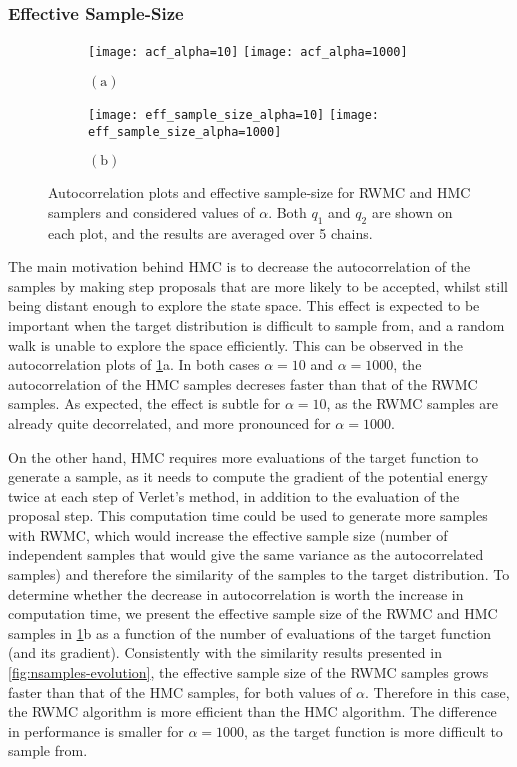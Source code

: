 \documentclass[a4paper, 12pt,oneside]{article}
\begin{document}
		\subsubsection{Effective Sample-Size}
		\begin{figure}[htb]
			\begin{subfigure}[b]{\textwidth}
				\centering
				\texttt{[image: acf\_alpha=10]}
				\texttt{[image: acf\_alpha=1000]}
				\caption*{$\mathrm{(a)}$}
			\end{subfigure}
				\begin{subfigure}[b]{\textwidth}
					\centering
					\texttt{[image: eff\_sample\_size\_alpha=10]}
					\texttt{[image: eff\_sample\_size\_alpha=1000]}
					\caption*{$\mathrm{(b)}$}
				\end{subfigure}
				\caption{Autocorrelation plots and effective sample-size for RWMC and HMC samplers and considered values of $\alpha$. Both $q_1$ and $q_2$ are shown on each plot, and the results are averaged over 5 chains.}
				\label{fig:acf-ess}
		\end{figure}
		The main motivation behind HMC is to decrease the autocorrelation of the samples by making step proposals that are more likely to be accepted, whilst still being distant enough to explore the state space. This effect is expected to be important when the target distribution is difficult to sample from, and a random walk is unable to explore the space efficiently.
		This can be observed in the autocorrelation plots of \ref{fig:acf-ess}a. In both cases $\alpha=10$ and $\alpha=1000$, the autocorrelation of the HMC samples decreses faster than that of the RWMC samples. As expected, the effect is subtle for $\alpha=10$, as the RWMC samples are already quite decorrelated, and more pronounced for $\alpha=1000$.

		On the other hand, HMC requires more evaluations of the target function to generate a sample, as it needs to compute the gradient of the potential energy twice at each step of Verlet's method, in addition to the evaluation of the proposal step. This computation time could be used to generate more samples with RWMC, which would increase the effective sample size (number of independent samples that would give the same variance as the autocorrelated samples) and therefore the similarity of the samples to the target distribution.
		To determine whether the decrease in autocorrelation is worth the increase in computation time, we present the effective sample size of the RWMC and HMC samples in \ref{fig:acf-ess}b as a function of the number of evaluations of the target function (and its gradient).
		Consistently with the similarity results presented in \ref{fig:nsamples-evolution}, the effective sample size of the RWMC samples grows faster than that of the HMC samples, for both values of $\alpha$. Therefore in this case, the RWMC algorithm is more efficient than the HMC algorithm.
		The difference in performance is smaller for $\alpha=1000$, as the target function is more difficult to sample from.
\end{document}
